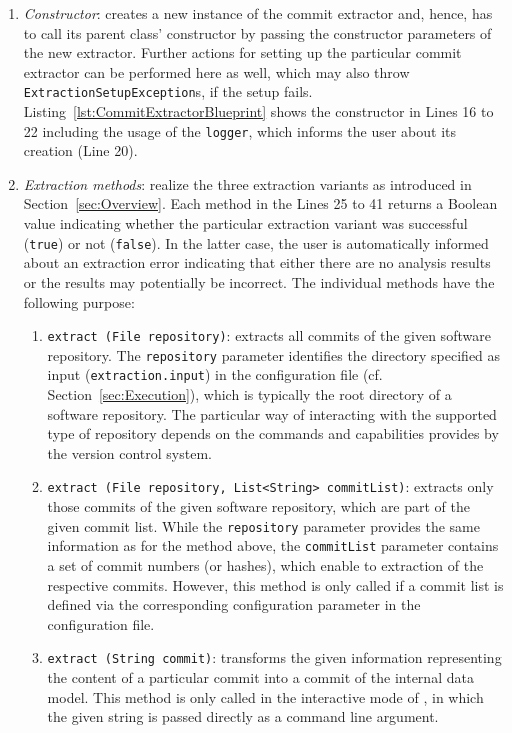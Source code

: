 \begin{enumerate}
	\item \textit{Constructor}: creates a new instance of the commit extractor and, hence, has to call its parent class’ constructor by passing the constructor parameters of the new extractor. Further actions for setting up the particular commit extractor can be performed here as well, which may also throw \texttt{ExtractionSetupException}s, if the setup fails. Listing~\ref{lst:CommitExtractorBlueprint} shows the constructor in Lines 16 to 22 including the usage of the \texttt{logger}, which informs the user about its creation (Line 20).
	\item \textit{Extraction methods}: realize the three extraction variants as introduced in Section~\ref{sec:Overview}. Each method in the Lines 25 to 41 returns a Boolean value indicating whether the particular extraction variant was successful (\texttt{true}) or not (\texttt{false}). In the latter case, the user is automatically informed about an extraction error indicating that either there are no analysis results or the results may potentially be incorrect. The individual methods have the following purpose:
	\begin{enumerate}
		\item \texttt{extract (File repository)}: extracts all commits of the given software repository. The \texttt{repository} parameter identifies the directory specified as input (\texttt{extraction.input}) in the configuration file (cf. Section~\ref{sec:Execution}), which is typically the root directory of a software repository. The particular way of interacting with the supported type of repository depends on the commands and capabilities provides by the version control system.
		\item \texttt{extract (File repository, List<String> commitList)}: extracts only those commits of the given software repository, which are part of the given commit list. While the \texttt{repository} parameter provides the same information as for the method above, the \texttt{commitList} parameter contains a set of commit numbers (or hashes), which enable to extraction of the respective commits. However, this method is only called if a commit list is defined via the corresponding configuration parameter in the configuration file.
		\item \texttt{extract (String commit)}: transforms the given information representing the content of a particular commit into a commit of the internal data model. This method is only called in the interactive mode of \thetool{}, in which the given string is passed directly as a command line argument.

\end{enumerate}
\end{enumerate}
